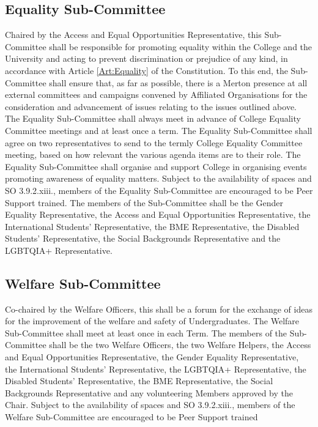\subsection{Equality Sub-Committee}
\npara Chaired by the Access and Equal Opportunities Representative, this Sub-Committee shall be responsible for promoting equality within the College and the University and acting to prevent discrimination or prejudice of any kind, in accordance with Article \ref{Art:Equality} of the Constitution. To this end, the Sub-Committee shall ensure that, as far as possible, there is a Merton presence at all external committees and campaigns convened by Affiliated Organisations for the consideration and advancement of issues relating to the issues outlined above.
\npara The Equality Sub-Committee shall always meet in advance of College Equality Committee meetings and at least once a term.
\npara The Equality Sub-Committee shall agree on two representatives to send to the termly College Equality Committee meeting, based on how relevant the various agenda items are to their role.
\npara The Equality Sub-Committee shall organise and support College in organising events promoting awareness of equality matters.
\npara Subject to the availability of spaces and SO 3.9.2.xiii., members of the Equality Sub-Committee are encouraged to be Peer Support trained.
\npara The members of the Sub-Committee shall be the Gender Equality Representative, the Access and Equal Opportunities Representative, the International Students’ Representative, the BME Representative, the Disabled Students’ Representative, the Social Backgrounds Representative and the LGBTQIA+ Representative.
\subsection{Welfare Sub-Committee}
\npara Co-chaired by the Welfare Officers, this shall be a forum for the exchange of ideas for the improvement of the welfare and safety of Undergraduates.
\npara The Welfare Sub-Committee shall meet at least once in each Term.
\npara The members of the Sub-Committee shall be the two Welfare Officers, the two Welfare Helpers, the Access and Equal Opportunities Representative, the Gender Equality Representative, the International Students’ Representative, the LGBTQIA+ Representative, the Disabled Students’ Representative, the BME Representative, the Social Backgrounds Representative and any volunteering Members approved by the Chair.
\npara Subject to the availability of spaces and SO 3.9.2.xiii., members of the Welfare Sub-Committee are encouraged to be Peer Support trained
